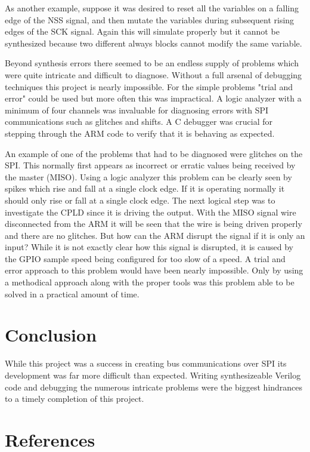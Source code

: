 \documentclass{article}
\begin{document}
As another example, suppose it was desired to reset all the variables on
a falling edge of the NSS signal, and then mutate the variables during
subsequent rising edges of the SCK signal.
Again this will simulate properly but it cannot be synthesized because
two different always blocks cannot modify the same variable.

Beyond synthesis errors there seemed to be an endless supply of problems
which were quite intricate and difficult to diagnose.
Without a full arsenal of debugging techniques this project is nearly impossible.
For the simple problems "trial and error" could be used but more
often this was impractical.
A logic analyzer with a minimum of four channels was invaluable for
diagnosing errors with SPI communications such as glitches and shifts.
A C debugger was crucial for stepping through the ARM code
to verify that it is behaving as expected.

An example of one of the problems that had to be diagnosed were
glitches on the SPI.
This normally first appears as incorrect or erratic values being
received by the master (MISO).
Using a logic analyzer this problem can be clearly seen by spikes
which rise and fall at a single clock edge.
If it is operating normally it should only rise or fall at a single clock edge.
The next logical step was to investigate the CPLD since it is driving the
output.
With the MISO signal wire disconnected from the ARM it will be seen that
the wire is being driven properly and there are no glitches.
But how can the ARM disrupt the signal if it is only an input?
While it is not exactly clear how this signal is disrupted, it is caused
by the GPIO sample speed being configured for too slow of a speed.
A trial and error approach to this problem would have been nearly impossible.
Only by using a methodical approach along with the proper tools was this
problem able to be solved in a practical amount of time.


\section{Conclusion}

While this project was a success in creating bus communications over SPI
its development was far more difficult than expected.
Writing synthesizeable Verilog code and debugging the numerous intricate
problems were the biggest hindrances to a timely completion of this project.


\clearpage

\pagebreak
\renewcommand*{\refname}{\vspace{-8mm}}
\section{References}
%


\end{document}
